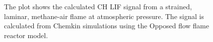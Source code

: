 \begin{figure}

\centering



\caption[Strained flame results]{The plot shows the calculated CH LIF signal from a strained, laminar, methane-air flame at atmospheric pressure. The signal is calculated from Chemkin simulations using the Opposed flow flame reactor model.}

\label{fig:strain}

\end{figure}
